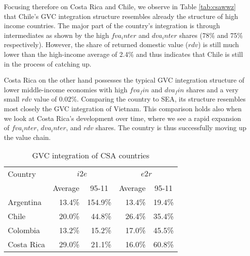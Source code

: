 \documentclass[11pt,a4paper]{article}
\begin{document}
Focusing therefore on Costa Rica and Chile, we observe in Table \ref{tab:csawwz} that Chile's GVC integration structure resembles already the structure of high income countries. The major part of the country's integration is through intermediates as shown by the high $fva_inter$ and $dva_inter$ shares (78\% and 75\% respectively). However, the share of returned domestic value ($rdv$) is still much lower than the high-income average of 2.4\% and thus indicates that Chile is still in the process of catching up.

Costa Rica on the other hand possesses the typical GVC integration structure of lower middle-income economies with high $fva_fin$ and $dva_fin$ shares and a very small $rdv$ value of 0.02\%. Comparing the country to SEA, its structure resembles most closely the GVC integration of Vietnam. This comparison holds also when we look at Costa Rica's development over time, where we see a rapid expansion of $fva_inter$, $dva_inter$, and $rdv$ shares. The country is thus successfully moving up the value chain.

\begin{table}[htbp]\small
  \centering
  \caption{GVC integration of CSA countries}
    \begin{tabular}{lrrrr}
    \toprule
    Country & \multicolumn{2}{c}{\multirow{1}[0]{*}{$i2e$}} & \multicolumn{2}{c}{\multirow{1}[0]{*}{$e2r$}} \\
    \multicolumn{1}{c}{} & \multicolumn{1}{c}{Average} & \multicolumn{1}{c}{95-11} & \multicolumn{1}{c}{Average} & \multicolumn{1}{c}{95-11} \\
    \midrule
    Argentina & 13.4\% & 154.9\% & 13.4\% & 19.4\% \\
    Chile & 20.0\% & 44.8\% & 26.4\% & 35.4\% \\
    Colombia & 13.2\% & 15.2\% & 17.0\% & 45.5\% \\
    Costa Rica & 29.0\% & 21.1\% & 16.0\% & 60.8\% \\
    \bottomrule
\end{tabular}
  \label{tab:csagvc}
\end{table}
\end{document}
